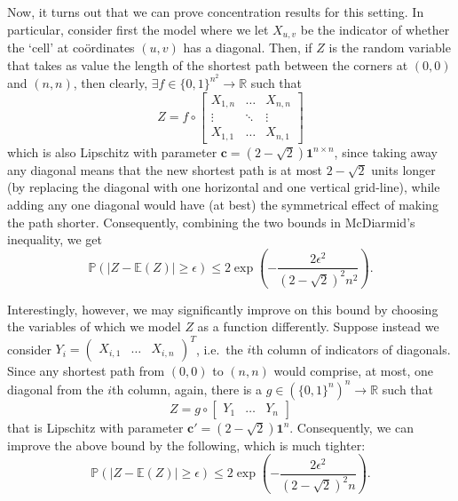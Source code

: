 	Now, it turns out that we can prove concentration results for this setting. In 
	particular, consider first the model where we let $X_{u,v}$ be the indicator of 
	whether the `cell' at co\"ordinates $(u,v)$ has a diagonal. Then, if $Z$ is the 
	random variable that takes as value the length of the shortest path between the 
	corners at $(0,0)$ and $(n,n)$, then clearly, $\exists f \in \{0,1\}^{n^2} 
	\rightarrow \mathbb{R}$ such that 
	$$
		Z = f \circ 
		\begin{bmatrix}
			X_{1,n} & \hdots & X_{n,n} \\
			\vdots & \ddots & \vdots \\
			X_{1,1} &\hdots & X_{n,1}
		\end{bmatrix}
	$$
	which is also Lipschitz with parameter $\mathbf{c} = (2-\sqrt 2) \mathbf{1}^{n\times n}$, 
	since taking away any diagonal means that the new shortest path is at most $2-\sqrt 2$ 
	units longer (by replacing the diagonal with one horizontal and one vertical grid-line),
	while adding any one diagonal would have (at best) the symmetrical effect of making the 
	path shorter. Consequently, combining the two bounds in McDiarmid's inequality, we get 
	$$
		\mathbb{P}(|Z-\mathbb{E}(Z)| \geq \epsilon) \leq 
		2 \exp \left(-\frac{2\epsilon^2}{(2-\sqrt 2)^2 n^2}\right).
	$$

	Interestingly, however, we may significantly improve on this bound by choosing the 
	variables of which we model $Z$ as a function differently. Suppose instead we consider 
	$Y_i = \begin{pmatrix} X_{i, 1} & \hdots & X_{i, n} \end{pmatrix}^T$, i.e.\ the $i$th column 
	of indicators of diagonals. Since any shortest path from $(0,0)$ to $(n,n)$ would comprise,
	at most, one diagonal from the $i$th column, again, there is a $g \in \left(\{0,1\}^{n}
	\right)^n \rightarrow \mathbb{R}$ such that 
	$$
		Z = g \circ \begin{bmatrix} Y_1 & \hdots & Y_n \end{bmatrix}
	$$
	that is Lipschitz with parameter $\mathbf{c}' = (2-\sqrt 2) \mathbf{1}^{n}$. Consequently,
	we can improve the above bound by the following, which is much tighter:
	$$
		\mathbb{P}(|Z-\mathbb{E}(Z)| \geq \epsilon) \leq 
		2 \exp \left(-\frac{2\epsilon^2}{(2-\sqrt 2)^2 n}\right).
	$$


